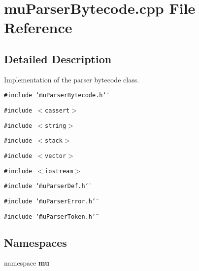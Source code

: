 \section{muParserBytecode.cpp File Reference}
\label{muParserBytecode_8cpp}


\subsection{Detailed Description}
Implementation of the parser bytecode class. 



{\tt \#include \char`\"{}muParserBytecode.h\char`\"{}}\par
{\tt \#include $<$cassert$>$}\par
{\tt \#include $<$string$>$}\par
{\tt \#include $<$stack$>$}\par
{\tt \#include $<$vector$>$}\par
{\tt \#include $<$iostream$>$}\par
{\tt \#include \char`\"{}muParserDef.h\char`\"{}}\par
{\tt \#include \char`\"{}muParserError.h\char`\"{}}\par
{\tt \#include \char`\"{}muParserToken.h\char`\"{}}\par
\subsection*{Namespaces}
\begin{CompactItemize}
\item 
namespace {\bf mu}
\end{CompactItemize}
